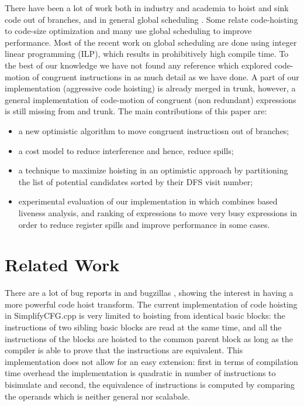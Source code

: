 \documentclass[acmlarge,review,anonymous]{acmart}\settopmatter{printfolios=true}
\begin{document}
There have been a lot of work both in industry and academia to hoist and sink
code out of branches, and in general global scheduling
\cite{click1995global}. Some relate code-hoisting to code-size optimization
\cite{rosen1988global} and many \cite{barany2013, shobaki2013} use global
scheduling to improve performance. Most of the recent work on global scheduling
are done using integer linear programming (ILP), which results in prohibitively
high compile time. To the best of our knowledge we have not found any reference
which explored code-motion of congruent instructions in as much detail as we
have done. A part of our implementation (aggressive code hoisting) is already
merged in \LLVM{} trunk, however, a general implementation of code-motion of
congruent (non redundant) expressions is still missing from \GCC{} and \LLVM{}
trunk. The main contributions of this paper are:
\begin{itemize}
\item a new optimistic algorithm to move congruent instructiosn out of branches;
\item a cost model to reduce interference and hence, reduce spills;
\item a technique to maximize hoisting in an optimistic approach by partitioning
  the list of potential candidates sorted by their DFS visit number;
\item experimental evaluation of our implementation in \LLVM{} which combines
  \SSA{} based liveness analysis, and ranking of expressions to move very busy
  expressions in order to reduce register spills and improve performance in some
  cases.
\end{itemize}

\section{Related Work}

There are a lot of bug reports in \GCC{} and \LLVM{} bugzillas
\cite{GCCCodeHoistingBugs, LLVMCodeHoistingBugs}, showing the interest in having
a more powerful code hoist transform.  The current \LLVM{} implementation of
code hoisting in SimplifyCFG.cpp is very limited to hoisting from identical
basic blocks: the instructions of two sibling basic blocks are read at the same
time, and all the instructions of the blocks are hoisted to the common parent
block as long as the compiler is able to prove that the instructions are
equivalent.  This implementation does not allow for an easy extension: first in
terms of compilation time overhead the implementation is quadratic in number of
instructions to bisimulate and second, the equivalence of instructions is
computed by comparing the operands which is neither general nor scalabale.
\end{document}
